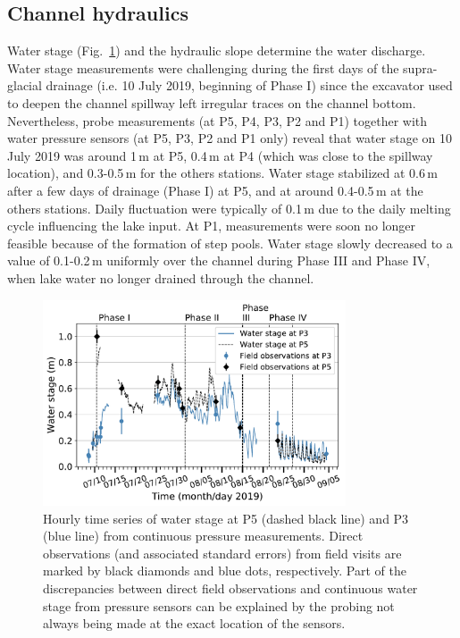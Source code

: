 \FloatBarrier

\subsection{Channel hydraulics}

Water stage (Fig.~\ref{fig:stage_P5_P3}) and the hydraulic slope determine the water discharge.
Water stage measurements were challenging  during the first days of the supra-glacial drainage (i.e. 10 July 2019, beginning of Phase I) since the excavator used to deepen the channel spillway left irregular traces on the channel bottom. Nevertheless, probe measurements (at P5, P4, P3, P2 and P1) together with water pressure sensors (at P5, P3, P2 and P1 only) reveal that water stage on 10 July 2019 was around 1\,m at P5, 0.4\,m at P4 (which was close to the spillway location), and 0.3-0.5\,m for the others stations. Water stage stabilized at 0.6\,m after a few days of drainage (Phase I) at P5, and at around 0.4-0.5\,m at the others stations. Daily fluctuation were typically of 0.1\,m due to the daily melting cycle influencing the lake input. At P1, measurements were soon no longer feasible because of the formation of step pools. Water stage slowly decreased to a value of 0.1-0.2\,m uniformly over the channel during Phase III and Phase IV, when lake water no longer drained through the channel.

\begin{figure}[h]
    \centering
    \includegraphics[width=0.8\textwidth]{chapters/chapter_plainemorte/fig05.pdf}
    \caption{Hourly time series of water stage at P5 (dashed black line) and P3 (blue line) from continuous pressure measurements. Direct observations (and associated standard errors) from field visits are marked by black diamonds and blue dots, respectively. Part of the discrepancies between direct field observations and continuous water stage from pressure sensors can be explained by the probing not always being made at the exact location of the sensors.}
    \label{fig:stage_P5_P3}
\end{figure}

